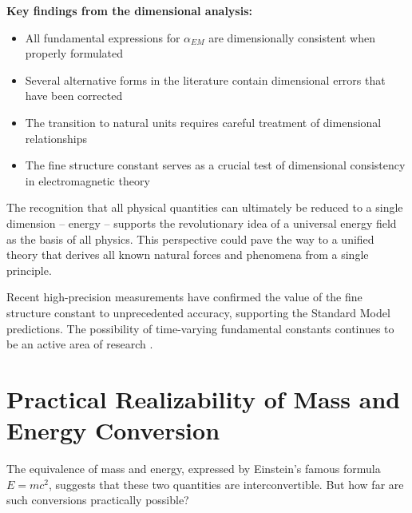 \documentclass[12pt,a4paper]{article}
\begin{document}
	\textbf{Key findings from the dimensional analysis:}
	\begin{itemize}
		\item All fundamental expressions for $\alpha_{EM}$ are dimensionally consistent when properly formulated
		\item Several alternative forms in the literature contain dimensional errors that have been corrected
		\item The transition to natural units requires careful treatment of dimensional relationships
		\item The fine structure constant serves as a crucial test of dimensional consistency in electromagnetic theory
	\end{itemize}
	
	The recognition that all physical quantities can ultimately be reduced to a single dimension – energy – supports the revolutionary idea of a universal energy field as the basis of all physics. This perspective could pave the way to a unified theory that derives all known natural forces and phenomena from a single principle.
	
	Recent high-precision measurements \cite{Parker2018} have confirmed the value of the fine structure constant to unprecedented accuracy, supporting the Standard Model predictions. The possibility of time-varying fundamental constants continues to be an active area of research \cite{Uzan2003}.
	
	\section{Practical Realizability of Mass and Energy Conversion}
	
	The equivalence of mass and energy, expressed by Einstein's famous formula $E = mc^2$, suggests that these two quantities are interconvertible. But how far are such conversions practically possible?
	
\end{document}
